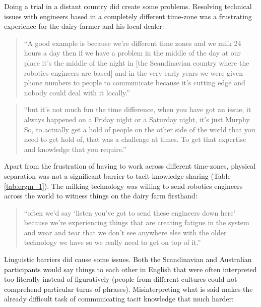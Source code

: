 Doing a trial in a distant country did create some problems. Resolving technical issues with engineers based in a completely different time-zone was a frustrating experience for the dairy farmer and his local dealer:

\begin{quote}
\small
\enquote{A good example is because we're different time zones and we milk 24 hours a day then if we have a problem in the middle of the day at our place it's the middle of the night in [the Scandinavian country where the robotics engineers are based] and in the very early years we were given phone numbers to people to communicate because it's cutting edge and nobody could deal with it locally.} \\
\end{quote}

\begin{quote}
\small
\enquote{but it's not much fun the time difference, when you have got an issue, it always happened on a Friday night or a Saturday night, it's just Murphy. So, to actually get a hold of people on the other side of the world that you need to get hold of, that was a challenge at times. To get that expertise and knowledge that you require.} \\
\end{quote}

Apart from the frustration of having to work across different time-zones, physical separation was not a significant barrier to tacit knowledge sharing (Table \ref{tab:ergm_1}). The milking technology was willing to send robotics engineers across the world to witness things on the dairy farm firsthand:

\begin{quote}
\small
\enquote{often we'd say \enquote{listen you've got to send these engineers down here} because we're experiencing things that are creating fatigue in the system and wear and tear that we don't see anywhere else with the older technology we have so we really need to get on top of it.} \\
\end{quote}

Linguistic barriers did cause some issues. Both the Scandinavian and Australian participants would say things to each other in English that were often interpreted too literally instead of figuratively (people from different cultures could not comprehend particular turns of phrases). Misinterpreting what is said makes the already difficult task of communicating tacit knowledge that much harder:

